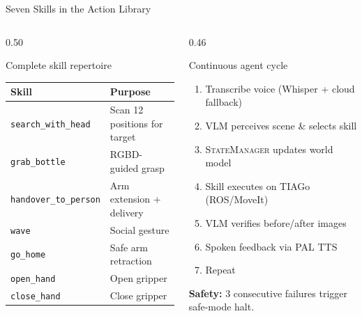 \documentclass[aspectratio=169, 10pt]{beamer}
\begin{document}
\begin{frame}{Seven Skills in the Action Library}
  \begin{columns}[T]
    \begin{column}{0.50\textwidth}
      \begin{block}{Complete skill repertoire}
        \small
        \renewcommand{\arraystretch}{1.2}
        \begin{tabular}{ll}
          \toprule
          \textbf{Skill} & \textbf{Purpose}\\
          \midrule
          \texttt{search\_with\_head}   & Scan 12 positions for target\\
          \texttt{grab\_bottle}         & RGBD-guided grasp\\
          \texttt{handover\_to\_person} & Arm extension + delivery\\
          \texttt{wave}                 & Social gesture\\
          \texttt{go\_home}             & Safe arm retraction\\
          \texttt{open\_hand}           & Open gripper\\
          \texttt{close\_hand}          & Close gripper\\
          \bottomrule
        \end{tabular}
      \end{block}
    \end{column}

    \begin{column}{0.46\textwidth}
      \begin{exampleblock}{Continuous agent cycle}
        \begin{enumerate}\small
          \item Transcribe voice (Whisper + cloud fallback)
          \item VLM perceives scene \& selects skill
          \item \textsc{StateManager} updates world model
          \item Skill executes on TIAGo (ROS/MoveIt)
          \item VLM verifies before/after images
          \item Spoken feedback via PAL TTS
          \item[$\circlearrowleft$] Repeat
        \end{enumerate}
      \end{exampleblock}
      \vspace{0.2em}
      {\small\color{upecgray}
        \textbf{Safety:} 3 consecutive failures
        trigger safe-mode halt.}
    \end{column}
  \end{columns}
\end{frame}
\end{document}
